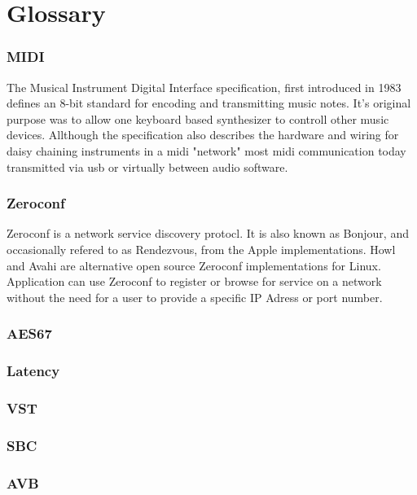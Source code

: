 \chapter{Glossary}

\subsection*{MIDI}
The Musical Instrument Digital Interface specification, first introduced in 1983 defines an 8-bit standard for encoding and transmitting music notes. It's original purpose was to allow one keyboard based synthesizer to controll other music devices.\cite{Boulanger:2011} Allthough the specification also describes the hardware and wiring for daisy chaining instruments in a midi "network" most midi communication today transmitted via usb or virtually between audio software.

\subsection*{Zeroconf}
Zeroconf is a network service discovery protocl. It is also known as Bonjour, and occasionally refered to as Rendezvous, from the Apple implementations. Howl and Avahi are alternative open source Zeroconf implementations for Linux. Application can use Zeroconf to register or browse for service on a network without the need for a user to provide a specific IP Adress or port number. \cite{zeroconf}

\subsection*{AES67}

\subsection*{Latency}

\subsection*{VST}
\subsection*{SBC}
\subsection*{AVB}